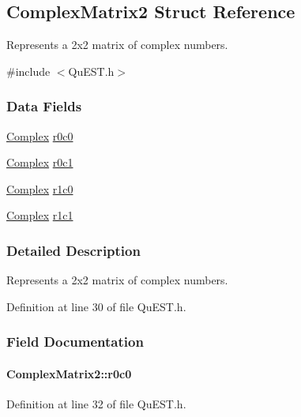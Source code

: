 \hypertarget{structComplexMatrix2}{
\subsection{ComplexMatrix2 Struct Reference}
\label{structComplexMatrix2}
}


Represents a 2x2 matrix of complex numbers.  


{\ttfamily \#include $<$QuEST.h$>$}\subsubsection*{Data Fields}
\begin{DoxyCompactItemize}
\item 
\hyperlink{structComplex}{Complex} \hyperlink{structComplexMatrix2_ae72b4458233b077a636beee1892e81ff}{r0c0}
\item 
\hyperlink{structComplex}{Complex} \hyperlink{structComplexMatrix2_a0f3932f055a8b05cef361bce25d51172}{r0c1}
\item 
\hyperlink{structComplex}{Complex} \hyperlink{structComplexMatrix2_ab98282015ed2065e53fbc9638e2583ab}{r1c0}
\item 
\hyperlink{structComplex}{Complex} \hyperlink{structComplexMatrix2_a763007c3070802373549ba0350f83c8a}{r1c1}
\end{DoxyCompactItemize}


\subsubsection{Detailed Description}
Represents a 2x2 matrix of complex numbers. 

Definition at line 30 of file QuEST.h.

\subsubsection{Field Documentation}
\hypertarget{structComplexMatrix2_ae72b4458233b077a636beee1892e81ff}{
\paragraph[{r0c0}]{ {\bf ComplexMatrix2::r0c0}}\hfill}
\label{structComplexMatrix2_ae72b4458233b077a636beee1892e81ff}


Definition at line 32 of file QuEST.h.

